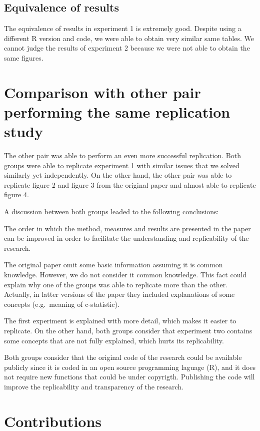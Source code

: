 \documentclass[10,a4paperpaper,]{article}
\begin{document}
\subsection{Equivalence of results}

The equivalence of results in experiment 1 is extremely good. Despite
using a different R version and code, we were able to obtain very
similar same tables. We cannot judge the results of experiment 2 because
we were not able to obtain the same figures.

\section{Comparison with other pair performing the same replication study}

The other pair was able to perform an even more successful replication.
Both groups were able to replicate experiment 1 with similar issues that
we solved similarly yet independently. On the other hand, the other pair
was able to replicate figure 2 and figure 3 from the original paper and
almost able to replicate figure 4.

A discussion between both groups leaded to the following conclusions:

The order in which the method, measures and results are presented in the
paper can be improved in order to facilitate the understanding and
replicability of the research.

The original paper omit some basic information assuming it is common
knowledge. However, we do not consider it common knowledge. This fact
could explain why one of the groups was able to replicate more than the
other. Actually, in latter versions of the paper they included
explanations of some concepts (e.g.~meaning of c-statistic).

The first experiment is explained with more detail, which makes it
easier to replicate. On the other hand, both groups consider that
experiment two contains some concepts that are not fully explained,
which hurts its replicability.

Both groups consider that the original code of the research could be
available publicly since it is coded in an open source programming
laguage (R), and it does not require new functions that could be under
copyrigth. Publishing the code will improve the replicability and
transparency of the research.

\section{Contributions}
\end{document}
